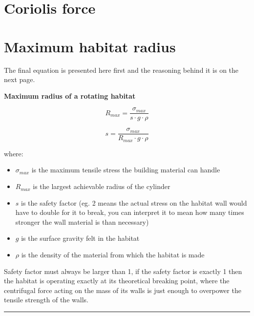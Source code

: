 \documentclass[a4paper]{article}
\begin{document}
	\pagebreak
	
	\section{Coriolis force}
	
	\pagebreak
	
	\section{Maximum habitat radius}
	
	The final equation is presented here first and the reasoning behind it is on the next page.
	
	\begin{center}
		\textbf{Maximum radius of a rotating habitat}
	\end{center}
	
	$$ R_{max} = \frac{\sigma_{max}}{s \cdot g \cdot \rho} $$
	
	$$ s = \frac{\sigma_{max}}{R_{max} \cdot g \cdot \rho} $$
	
	where:
	
	\begin{itemize}
		\item $\sigma_{max}$ is the maximum tensile stress the building material can handle
		
		\item $R_{max}$ is the largest achievable radius of the cylinder
		
		\item $s$ is the safety factor (eg. 2 means the actual stress on the habitat wall would have to double for it to break, you can interpret it to mean how many times stronger the wall material is than necessary)
		
		\item $g$ is the surface gravity felt in the habitat
		
		\item $\rho$ is the density of the material from which the habitat is made
	\end{itemize}
	
	Safety factor must always be larger than 1, if the safety factor is exactly 1 then the habitat is operating exactly at its theoretical breaking point, where the centrifugal force acting on the mass of its walls is just enough to overpower the tensile strength of the walls.
	
	\bigskip
	
	\noindent \rule{\linewidth}{1pt}
	
\end{document}
